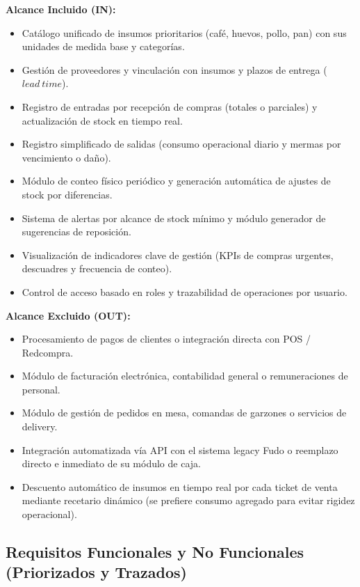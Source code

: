 \documentclass[11pt,letterpaper]{article}
\begin{document}
\textbf{Alcance Incluido (IN):}
\begin{itemize}
    \item Catálogo unificado de insumos prioritarios (café, huevos, pollo, pan) con sus unidades de medida base y categorías.
    \item Gestión de proveedores y vinculación con insumos y plazos de entrega ($lead\ time$).
    \item Registro de entradas por recepción de compras (totales o parciales) y actualización de stock en tiempo real.
    \item Registro simplificado de salidas (consumo operacional diario y mermas por vencimiento o daño).
    \item Módulo de conteo físico periódico y generación automática de ajustes de stock por diferencias.
    \item Sistema de alertas por alcance de stock mínimo y módulo generador de sugerencias de reposición.
    \item Visualización de indicadores clave de gestión (KPIs de compras urgentes, descuadres y frecuencia de conteo).
    \item Control de acceso basado en roles y trazabilidad de operaciones por usuario.
\end{itemize}

\textbf{Alcance Excluido (OUT):}
\begin{itemize}
    \item Procesamiento de pagos de clientes o integración directa con POS / Redcompra.
    \item Módulo de facturación electrónica, contabilidad general o remuneraciones de personal.
    \item Módulo de gestión de pedidos en mesa, comandas de garzones o servicios de delivery.
    \item Integración automatizada vía API con el sistema legacy Fudo o reemplazo directo e inmediato de su módulo de caja.
    \item Descuento automático de insumos en tiempo real por cada ticket de venta mediante recetario dinámico (se prefiere consumo agregado para evitar rigidez operacional).
\end{itemize}

\subsection{Requisitos Funcionales y No Funcionales (Priorizados y Trazados)}
\end{document}
